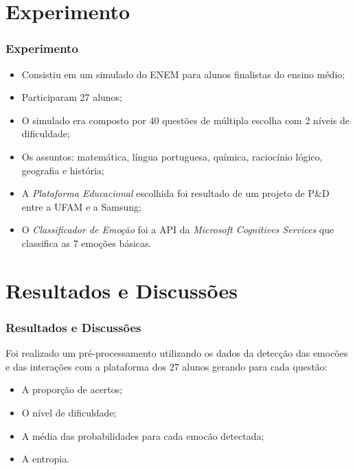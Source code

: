 \documentclass{beamer}
\begin{document}
\section{Experimento}
\begin{frame}
\frametitle{Experimento}
\begin{itemize}
\pause
\item Consistiu em um simulado do ENEM para alunos finalistas do ensino m\'{e}dio;
\pause
\item Participaram 27 alunos;
\pause
\item O simulado era composto por 40 quest\~{o}es de m\'{u}ltipla escolha com 2 n\'{i}veis de dificuldade;
\pause
\item Os assuntos: matem\'{a}tica, l\'{i}ngua portuguesa, qu\'{i}mica, racioc\'{i}nio l\'{o}gico, geografia e hist\'{o}ria;
\pause
\item A \textit{Plataforma Educacional} escolhida foi resultado de um projeto de P\&D entre a UFAM e a Samsung;
\pause
\item O \textit{Classificador de Emo\c{c}\~ao} foi a API da \textit{Microsoft Cognitives Services} que classifica as 7 emo\c{c}\~oes b\'{a}sicas.
\end{itemize}

\end{frame}





\section{Resultados e Discuss\~oes}
\begin{frame}
\frametitle{Resultados e Discuss\~oes}
\pause
Foi realizado um pr\'{e}-processamento utilizando os dados da detec\c{c}\~ao das emoc\~oes e das intera\c{c}\~oes com a plataforma dos 27 alunos 
gerando para cada quest\~ao:

\begin{itemize}
\pause
\item A propor\c{c}\~ao de acertos;
\pause
\item O n\'{i}vel de dificuldade;
\pause
\item A m\'{e}dia das probabilidades para cada emoc\~ao detectada;
\pause
\item A entropia.
\end{itemize}

\end{frame}
\end{document}
